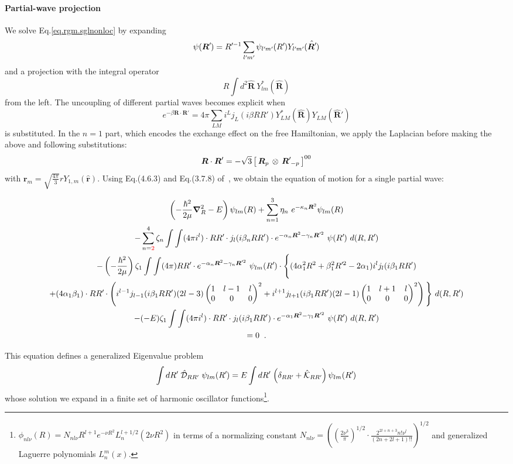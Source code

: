 \documentclass
[aps,nofootinbib,prl,showpacs,twocolumn,groupedaddress,superscriptaddress]
{revtex4}
\newcommand*{\mprime}{^{\prime}\mkern-1.2mu}
\newcommand{\red}[1]{\textcolor{red}{#1}}
\newcommand{\la}{\label}
\newcommand{\be}{\begin{equation}}
\newcommand{\ee}{\end{equation}}
\newcommand{\ve}[1]{\ensuremath{\boldsymbol{#1}}}
\newcommand{\coup}[3]{\left[\,#1\,\otimes\,#2\,\right]^{#3}}
\newcommand{\threej}[6]{ \begin{pmatrix}
   #1 & #2 & #3 \\
   #4 & #5 & #6 
  \end{pmatrix}}
\begin{document}
\paragraph{Partial-wave projection} We solve Eq.\eqref{eq.rgm.sglnonloc} by expanding
\be
\psi(\ve{R}\mprime)=R\mprime^{-1}\sum_{l\mprime m\mprime}\psi_{l\mprime m\mprime}(R\mprime)Y_{l\mprime m\mprime}(\hat{\ve{R}\mprime})
\ee
and a projection with the integral operator
\be
R\int d^2\hat{\ve{R}}~Y^*_{lm}(\hat{\ve{R}})
\ee
from the left. The uncoupling of different partial waves becomes explicit when
\be
e^{-\beta\ve{R}\cdot\ve{R}'}=4\pi\sum_{LM}i^Lj_L(i\beta RR')Y^*_{LM}(\hat{\ve{R}})Y_{LM}(\hat{\ve{R}}')
\ee
is substituted. In the $n=1$ part, which encodes the exchange effect on the free
Hamiltonian, we apply the Laplacian before making the above and following
substitutions:
\be
\ve{R}\cdot\ve{R}'=-\sqrt{3}\coup{\ve{R}_p}{\ve{R}\mprime_{-p}}{00}
\ee
with $\ve{r}_m=\sqrt{\frac{4\pi}{3}}rY_{1,m}(\hat{\ve{r}})$. Using Eq.(4.6.3) and
Eq.(3.7.8) of~\cite{Edmonds}, we obtain the equation of motion for a single
partial wave:
\begin{widetext}
\begin{subequations}\la{eq.rgm.sglnonloc.pw}
\begin{gather}
\left(-\frac{\hbar^2}{2\mu}\ve{\nabla}_R^2-E\right)\psi_{lm}(R)+
\sum_{n=1}^3\eta_n~e^{-\kappa_n\ve{R}^2}\psi_{lm}(R)\la{eq.rgm.sglnonloc.pw.t}\\
-\sum_{n=\red{2}}^4\zeta_n\int\int
(4\pi i^l)\cdot RR\mprime\cdot j_l(i\beta_n RR')\cdot 
e^{-\alpha_n\ve{R}^2-\gamma_n\ve{R}'^2}~\psi(R\mprime)~d(R,R\mprime)\la{eq.rgm.sglnonloc.pw.noloc}\\
-\left(-\frac{\hbar^2}{2\mu}\right)\zeta_1\int\int
(4\pi) RR\mprime\cdot e^{-\alpha_n\ve{R}^2-\gamma_n\ve{R}'^2}~\psi_{lm}(R\mprime)
\cdot\Bigg\lbrace
(4\alpha_1^2R^2+\beta_1^2R\mprime^2-2\alpha_1) i^l j_{l}(i\beta_1 RR')\nonumber\\
+
(4\alpha_1\beta_1)\cdot RR\mprime\cdot
 \left(i^{l-1} j_{l-1}(i\beta_1 RR') (2l-3)
 \threej{1}{l-1}{l}{0}{0}{0}^2+
 i^{l+1} j_{l+1}(i\beta_1 RR') (2l-1)
 \threej{1}{l+1}{l}{0}{0}{0}^2\right)\Bigg\rbrace
~d(R,R\mprime)\la{eq.rgm.sglnonloc.pw.tex}\\
-(-E)\zeta_1\int\int
(4\pi i^l)\cdot RR\mprime\cdot j_l(i\beta_1 RR')\cdot
 e^{-\alpha_1\ve{R}^2-\gamma_1\ve{R}'^2}~\psi(R\mprime)~d(R,R\mprime)\la{eq.rgm.sglnonloc.pw.Eex}\\
 =0\;\;.\nonumber
\end{gather}
\end{subequations}
\end{widetext}
This equation defines a generalized Eigenvalue problem
\be\la{eq.rgm.gev}
\int dR\mprime~\hat{\mathcal{D}}_{RR\mprime}~\psi_{lm}(R\mprime)=
E\int dR\mprime\,\left(\delta_{RR\mprime}+\hat{\mathcal{K}}_{RR\mprime}\right)
\psi_{lm}(R\mprime)
\ee
whose solution we expand in a finite set of harmonic oscillator
functions\footnote{
$\phi_{nl\nu}(R)=N_{nl\nu}R^{l+1}e^{-\nu R^2}L_{n}^{l+1/2}(2\nu R^2)$
in terms of a normalizing constant $N_{nl\nu}=
\left(\left(\frac{2\nu^3}{\pi}\right)^{1/2}\cdot\frac{2^{2l+n+3}n!\nu^l}{(2n+2l+1)!!}\right)^{1/2}$ and generalized
Laguerre polynomials $L_n^m(x)$.
}.
\end{document}
